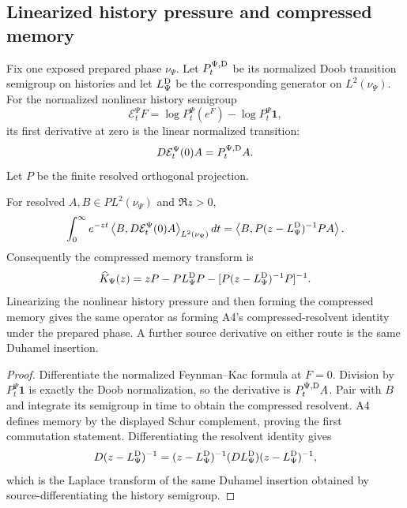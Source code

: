 \subsection{Linearized history pressure and compressed memory}

Fix one exposed prepared phase \(\nu_\Psi\).  Let
\(P_t^{\Psi,\rm D}\) be its normalized Doob transition semigroup on histories
and let \(L_\Psi^{\rm D}\) be the corresponding generator on
\(L^2(\nu_\Psi)\).  For the normalized nonlinear history semigroup
\[
 \mathcal E_t^\Psi F
 =\log P_t^\Psi(e^F)-\log P_t^\Psi\mathbf1,
\]
its first derivative at zero is the linear normalized transition:
\[
 D\mathcal E_t^\Psi(0)A=P_t^{\Psi,\rm D}A.
\]
Let \(P\) be the finite resolved orthogonal projection.

\begin{theorem}
\label{thm:r3-c2-memory}
For resolved \(A,B\in PL^2(\nu_\Psi)\) and \(\Re z>0\),
\[
 \int_0^\infty e^{-zt}
 \left\langle B,D\mathcal E_t^\Psi(0)A\right\rangle_{L^2(\nu_\Psi)}dt
 =\left\langle
 B,P(z-L_\Psi^{\rm D})^{-1}PA
 \right\rangle.
\]
Consequently the compressed memory transform is
\[
 \widehat K_\Psi(z)
 =zP-PL_\Psi^{\rm D}P-
 [P(z-L_\Psi^{\rm D})^{-1}P]^{-1}.
\]
Linearizing the nonlinear history pressure and then forming the compressed
memory gives the same operator as forming A4's compressed-resolvent identity
under the prepared phase.  A further source derivative on either route is the
same Duhamel insertion.
\end{theorem}

\begin{proof}
Differentiate the normalized Feynman--Kac formula at \(F=0\).  Division by
\(P_t^\Psi\mathbf1\) is exactly the Doob normalization, so the derivative is
\(P_t^{\Psi,\rm D}A\).  Pair with \(B\) and integrate its semigroup in time to
obtain the compressed resolvent.  A4 defines memory by the displayed Schur
complement, proving the first commutation statement.  Differentiating the
resolvent identity gives
\[
 D(z-L_\Psi^{\rm D})^{-1}
 =(z-L_\Psi^{\rm D})^{-1}
 (DL_\Psi^{\rm D})
 (z-L_\Psi^{\rm D})^{-1},
\]
which is the Laplace transform of the same Duhamel insertion obtained by
source-differentiating the history semigroup.
\end{proof}
